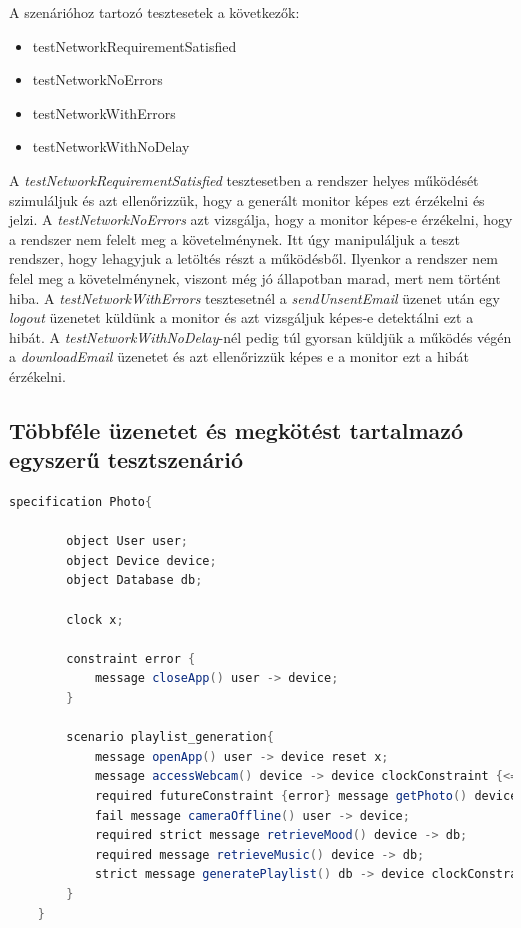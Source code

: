 A szenárióhoz tartozó tesztesetek a következők:

\begin{itemize}
    \item testNetworkRequirementSatisfied
    \item testNetworkNoErrors
    \item testNetworkWithErrors
    \item testNetworkWithNoDelay
\end{itemize}

A \textit{testNetworkRequirementSatisfied} tesztesetben a rendszer helyes működését szimuláljuk és azt ellenőrizzük, hogy a generált monitor képes ezt érzékelni és jelzi.
A \textit{testNetworkNoErrors} azt vizsgálja, hogy a monitor képes-e érzékelni, hogy a rendszer nem felelt meg a követelménynek.
Itt úgy manipuláljuk a teszt rendszer, hogy lehagyjuk a letöltés részt a működésből.
Ilyenkor a rendszer nem felel meg a követelménynek, viszont még jó állapotban marad, mert nem történt hiba.
A \textit{testNetworkWithErrors} tesztesetnél a \textit{sendUnsentEmail} üzenet után egy \textit{logout} üzenetet küldünk a monitor és azt vizsgáljuk képes-e detektálni ezt a hibát.
A \textit{testNetworkWithNoDelay}-nél pedig túl gyorsan küldjük a működés végén a \textit{downloadEmail} üzenetet és azt ellenőrizzük képes e a monitor ezt a hibát érzékelni.

\subsection{Többféle üzenetet és megkötést tartalmazó egyszerű tesztszenárió}

\begin{lstlisting}[language=java, frame=single, float=ht!, caption={Integrációs teszteset.},captionpos=b]
    specification Photo{

        object User user;
        object Device device;
        object Database db;

        clock x;

        constraint error {
            message closeApp() user -> device;
        }

        scenario playlist_generation{
            message openApp() user -> device reset x;
            message accessWebcam() device -> device clockConstraint {<=(x, 5)} reset x;
            required futureConstraint {error} message getPhoto() device -> user;
            fail message cameraOffline() user -> device;
            required strict message retrieveMood() device -> db;
            required message retrieveMusic() device -> db;
            strict message generatePlaylist() db -> device clockConstraint {<(x, 15)};
        }
    }
\end{lstlisting}

